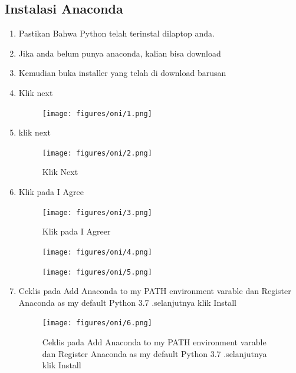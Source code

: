 \subsection{Instalasi Anaconda}
\begin{enumerate}
    \item Pastikan Bahwa Python telah terinstal dilaptop anda.
    \item Jika anda belum punya anaconda, kalian bisa download
    \item Kemudian buka installer yang telah di download barusan
    \item Klik next
    \begin{figure}[H]
        \centering
        \texttt{[image: figures/oni/1.png]}
        \label{awal}
        \end{figure}

    \item klik next
    \begin{figure}[H]
        \centering
        \texttt{[image: figures/oni/2.png]}
        \caption{Klik Next}
        \label{License}
        \end{figure}

    \item Klik pada I Agree
     \begin{figure}[H]
        \centering
        \texttt{[image: figures/oni/3.png]}
        \caption{Klik pada I Agreer}
        \label{User}
        \end{figure}

    \begin{figure}[!htbp]
        \centering
        \texttt{[image: figures/oni/4.png]}
        \label{Directory}
        \end{figure}

     \begin{figure}[H]
        \centering
        \texttt{[image: figures/oni/5.png]}
        \label{opsi}
        \end{figure}

    \item Ceklis pada Add Anaconda to my PATH environment varable dan Register Anaconda as my default Python 3.7 .selanjutnya klik Install
    \begin{figure}[H]
        \centering
        \texttt{[image: figures/oni/6.png]}
        \caption{Ceklis pada Add Anaconda to my PATH environment varable dan Register Anaconda as my default Python 3.7 .selanjutnya klik Install}
        \label{Proses}
        \end{figure}


\end{enumerate}
